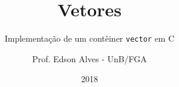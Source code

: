 \title{Vetores}
\subtitle{Implementação de um contêiner \texttt{vector} em C}
\author{Prof. Edson Alves - UnB/FGA}
\date{2018}
